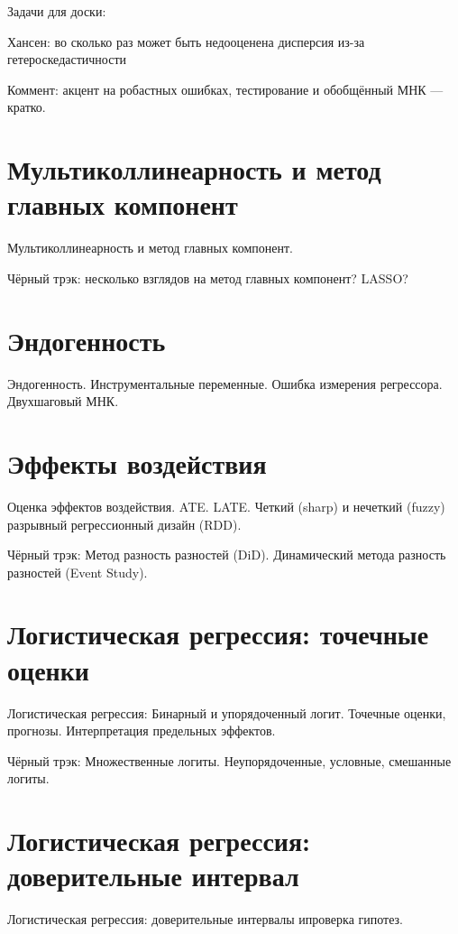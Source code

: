 \documentclass[12pt]{article}
\begin{document}
Задачи для доски:

Хансен: во сколько раз может быть недооценена дисперсия из-за гетероскедастичности


Коммент: акцент на робастных ошибках, тестирование и обобщённый МНК — кратко.

\section{Мультиколлинеарность и метод главных компонент}
Мультиколлинеарность и метод главных компонент.

Чёрный трэк: несколько взглядов на метод главных компонент? LASSO?


\section{Эндогенность}
Эндогенность. Инструментальные переменные. Ошибка измерения регрессора. Двухшаговый МНК.


\section{Эффекты воздействия}
Оценка эффектов воздействия. ATE. LATE. Четкий (sharp) и нечеткий (fuzzy) разрывный регрессионный дизайн (RDD).

Чёрный трэк: Метод разность разностей (DiD). Динамический метода разность разностей (Event Study).



\section{Логистическая регрессия: точечные оценки}
Логистическая регрессия: Бинарный и упорядоченный логит. Точечные оценки, прогнозы.  Интерпретация предельных эффектов.

Чёрный трэк: Множественные логиты. Неупорядоченные, условные, смешанные логиты.

\section{Логистическая регрессия: доверительные интервал}
Логистическая регрессия: доверительные интервалы ипроверка гипотез.
\end{document}
